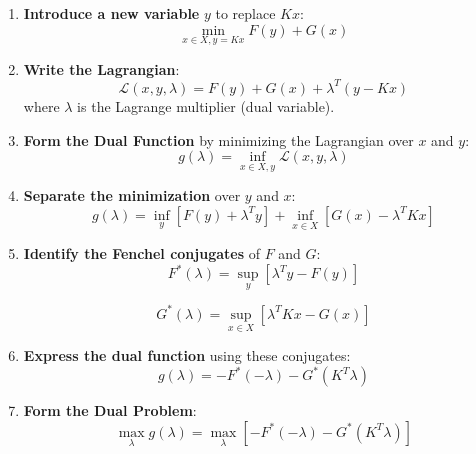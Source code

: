 \documentclass[12pt]{article}
\begin{document}
\begin{enumerate}
  \item \textbf{Introduce a new variable} \( y \) to replace \( Kx \):
  \begin{equation}
  \min_{x \in X, y = Kx} F(y) + G(x)
  \end{equation}

  \item \textbf{Write the Lagrangian}:
  \begin{equation}
  \mathcal{L}(x, y, \lambda) = F(y) + G(x) + \lambda^T (y - Kx)
  \end{equation}
  where \( \lambda \) is the Lagrange multiplier (dual variable).

  \item \textbf{Form the Dual Function} by minimizing the Lagrangian over \( x \) and \( y \):
  \begin{equation}
  g(\lambda) = \inf_{x \in X, y} \mathcal{L}(x, y, \lambda)
  \end{equation}

  \item \textbf{Separate the minimization} over \( y \) and \( x \):
  \begin{equation}
  g(\lambda) = \inf_{y} \left[ F(y) + \lambda^T y \right] + \inf_{x \in X} \left[ G(x) - \lambda^T Kx \right]
  \end{equation}

  \item \textbf{Identify the Fenchel conjugates} of \( F \) and \( G \):
  \begin{equation}
  F^*(\lambda) = \sup_{y} \left[ \lambda^T y - F(y) \right]
  \end{equation}

  \begin{equation}
  G^*(\lambda) = \sup_{x \in X} \left[ \lambda^T Kx - G(x) \right]
  \end{equation}

  \item \textbf{Express the dual function} using these conjugates:
  \begin{equation}
  g(\lambda) = -F^*(-\lambda) - G^*(K^T \lambda)
  \end{equation}

  \item \textbf{Form the Dual Problem}:
  \begin{equation}
  \max_{\lambda} g(\lambda) = \max_{\lambda} \left[ -F^*(-\lambda) - G^*(K^T \lambda) \right]
  \end{equation}
\end{enumerate}
\end{document}
